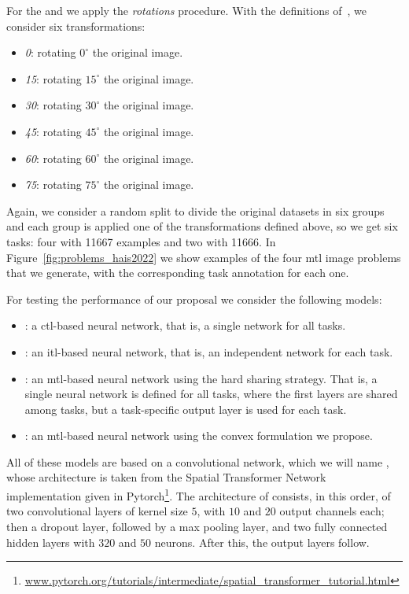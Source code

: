%
For the  and  we apply the \emph{rotations} procedure. With the definitions of~\cite{GhifaryKZB15}, we consider six transformations:
\begin{itemize}
    \item \textit{0}: rotating $0^{\circ}$ the original image.
    \item \textit{15}: rotating $15^{\circ}$ the original image.
    \item \textit{30}: rotating $30^{\circ}$ the original image.
    \item \textit{45}: rotating $45^{\circ}$ the original image.
    \item \textit{60}: rotating $60^{\circ}$ the original image.
    \item \textit{75}: rotating $75^{\circ}$ the original image.
\end{itemize}
Again, we consider a random split to divide the original datasets in six groups and each group is applied one of the transformations defined above, so we get six tasks: four with \num{11667} examples and two with \num{11666}.
%
In Figure~\ref{fig:problems_hais2022} we show examples of the four \acrshort{mtl} image problems that we generate, with the corresponding task annotation for each one.



For testing the performance of our proposal we consider the following models:
\begin{itemize}
    \item {}: a \acrshort{ctl}-based neural network, that is, a single network for all tasks.
    \item {}: an \acrshort{itl}-based neural network, that is, an independent network for each task.
    \item {}: an \acrshort{mtl}-based neural network using the hard sharing strategy. That is, a single neural network is defined for all tasks, where the first layers are shared among tasks, but a task-specific output layer is used for each task.
    \item {}: an \acrshort{mtl}-based neural network using the convex formulation we propose.
\end{itemize}
All of these models are based on a convolutional network, which we will name , whose architecture is taken from the Spatial Transformer Network~\citep{Jaderberg_2015} implementation given in Pytorch\footnote{\href{www.pytorch.org/tutorials/intermediate/spatial\_transformer\_tutorial.html}{www.pytorch.org/tutorials/intermediate/spatial\_transformer\_tutorial.html}}.
The architecture of  consists, in this order, of two convolutional layers of kernel size $5$, with $10$ and $20$ output channels each; then a dropout layer, followed by a max pooling layer, and two fully connected hidden layers with $320$ and $50$ neurons. After this, the output layers follow.

